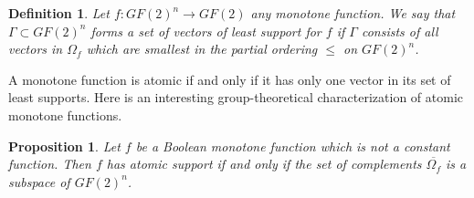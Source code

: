 \documentclass[12pt]{article}
\newtheorem{proposition}[theorem]{Proposition}
\newtheorem{definition}[theorem]{Definition}
\begin{document}
\begin{definition}
\label{def:leastsupport}
{\rm
Let $f:GF(2)^n \to GF(2)$ any monotone function.
We say that $\Gamma\subset GF(2)^n$ forms a set of vectors of
{\it least support} for $f$ if $\Gamma$ consists of all
vectors in $\Omega_f$ which are smallest in the
partial ordering $\leq$ on $GF(2)^n$.
}
\end{definition}

 A monotone function is atomic if and only if it has only one vector in
its set of least supports.
Here is an interesting group-theoretical characterization of atomic
monotone functions.

\begin{proposition}
\label{prop:atomic-subspace}
Let $f$ be a Boolean monotone function which is not a constant function.
Then $f$ has atomic support if and only if the
set of complements $\overline{\Omega_f}$ is a subspace of $GF(2)^n$.
\end{proposition}
\end{document}
